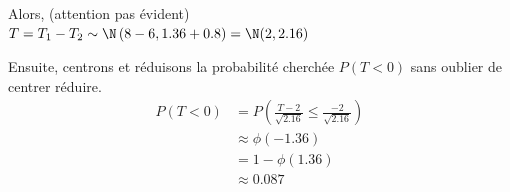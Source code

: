 \begin{exo}
\begin{center}
		Alors, (attention pas évident)\\
		$T = T_1 - T_2 \sim \N\left(8-6, 1.36 + 0.8\right) = \N(2,2.16)$
	\end{center}
		Ensuite, centrons et réduisons la probabilité cherchée $P(T < 0)$ sans oublier de centrer réduire.
		\begin{align*}
			P(T < 0) & = P\left(\frac{T-2}{\sqrt{2.16}} \leq \frac{-2}{\sqrt{2.16}}\right) \\
			&\approx \phi(-1.36) \\
			&= 1- \phi(1.36) \\
			&\approx 0.087
		\end{align*}
\end{exo}
